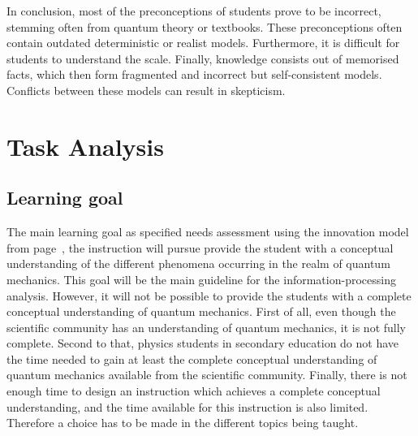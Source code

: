\documentclass[11pt,twoside]{report} %
\begin{document}
In conclusion, most of the preconceptions of students prove to be incorrect, stemming often from quantum theory or textbooks. These preconceptions often contain outdated deterministic or realist models. Furthermore, it is difficult for students to understand the scale. Finally, knowledge consists out of memorised facts, which then form fragmented and incorrect but self-consistent models. Conflicts between these models can result in skepticism.


\section{Task Analysis}
\label{ch:taskanalysis}

\subsection{Learning goal}

The main learning goal as specified needs assessment using the innovation model from page~\pageref{sssec:needsassessmentinnovation}, the instruction will pursue provide the student with a conceptual understanding of the different phenomena occurring in the realm of quantum mechanics. This goal will be the main guideline for the information-processing analysis. However, it will not be possible to provide the students with a complete conceptual understanding of quantum mechanics. First of all, even though the scientific community has an understanding of quantum mechanics, it is not fully complete. Second to that, physics students in secondary education do not have the time needed to gain at least the complete conceptual understanding of quantum mechanics available from the scientific community. Finally, there is not enough time to design an instruction which achieves a complete conceptual understanding, and the time available for this instruction is also limited. Therefore a choice has to be made in the different topics being taught.
\end{document}
